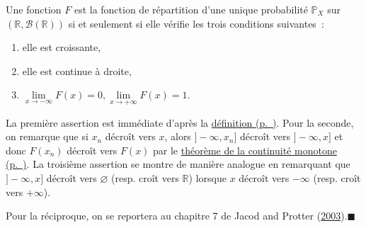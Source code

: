 \begin{theoreme}\label{I-theofdr}

Une fonction \(F\) est la fonction de répartition d'une unique
probabilité \(\mathbb{P}_X\) sur
\((\mathbb{R},\mathcal{B}(\mathbb{R}))\) si et seulement si elle vérifie
les trois conditions suivantes~:

\begin{enumerate}
\def\labelenumi{\arabic{enumi}.}
\tightlist
\item
  elle est croissante,
\item
  elle est continue à droite,
\item
  \(\lim\limits_{x \to -\infty} F(x) = 0, \lim\limits_{x \to +\infty} F(x) = 1\).
\end{enumerate}
\end{theoreme}

\begin{preuve}
La première assertion est immédiate d'après la
\protect\hyperref[I-deffdr]{définition (p.~\pageref*{I-deffdr})}. Pour
la seconde, on remarque que si \(x_n\) décroît vers \(x\), alors
\(]-\infty,x_n]\) décroît vers \(]-\infty,x]\) et donc \(F(x_n)\)
décroît vers \(F(x)\) par le
\protect\hyperref[I-continuitemonotone]{théorème de la continuité
monotone (p.~\pageref*{I-continuitemonotone})}. La troisième assertion
se montre de manière analogue en remarquant que \(]-\infty,x]\) décroît
vers \(\varnothing\) (resp. croît vers \(\mathbb{R}\)) lorsque \(x\)
décroît vers \(-\infty\) (resp. croît vers \(+\infty\)).

Pour la réciproque, on se reportera au chapitre 7 de Jacod and Protter
(\protect\hyperlink{refI-Jacod}{2003}).\hfill$\blacksquare$
\end{preuve}

